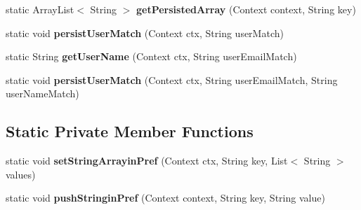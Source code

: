 \begin{DoxyCompactItemize}
\item 
static Array\+List$<$ String $>$ {\bfseries get\+Persisted\+Array} (Context context, String key)\hypertarget{classcom_1_1example_1_1sebastian_1_1tindertp_1_1commonTools_1_1ArraySerialization_aab5218831832e2dfd0807177e139225d}{}\label{classcom_1_1example_1_1sebastian_1_1tindertp_1_1commonTools_1_1ArraySerialization_aab5218831832e2dfd0807177e139225d}

\item 
static void {\bfseries persist\+User\+Match} (Context ctx, String user\+Match)\hypertarget{classcom_1_1example_1_1sebastian_1_1tindertp_1_1commonTools_1_1ArraySerialization_a59bd32db77f877b42d4d0fe14dc4c5c0}{}\label{classcom_1_1example_1_1sebastian_1_1tindertp_1_1commonTools_1_1ArraySerialization_a59bd32db77f877b42d4d0fe14dc4c5c0}

\item 
static String {\bfseries get\+User\+Name} (Context ctx, String user\+Email\+Match)\hypertarget{classcom_1_1example_1_1sebastian_1_1tindertp_1_1commonTools_1_1ArraySerialization_aa7ae212523ee85ff8e3c1ab9ab2baf84}{}\label{classcom_1_1example_1_1sebastian_1_1tindertp_1_1commonTools_1_1ArraySerialization_aa7ae212523ee85ff8e3c1ab9ab2baf84}

\item 
static void {\bfseries persist\+User\+Match} (Context ctx, String user\+Email\+Match, String user\+Name\+Match)\hypertarget{classcom_1_1example_1_1sebastian_1_1tindertp_1_1commonTools_1_1ArraySerialization_a74148a23761f8cd487aa6d48370e030d}{}\label{classcom_1_1example_1_1sebastian_1_1tindertp_1_1commonTools_1_1ArraySerialization_a74148a23761f8cd487aa6d48370e030d}

\end{DoxyCompactItemize}
\subsection*{Static Private Member Functions}
\begin{DoxyCompactItemize}
\item 
static void {\bfseries set\+String\+Arrayin\+Pref} (Context ctx, String key, List$<$ String $>$ values)\hypertarget{classcom_1_1example_1_1sebastian_1_1tindertp_1_1commonTools_1_1ArraySerialization_a5e7b7c56bf40ca5344db9806615e81ca}{}\label{classcom_1_1example_1_1sebastian_1_1tindertp_1_1commonTools_1_1ArraySerialization_a5e7b7c56bf40ca5344db9806615e81ca}

\item 
static void {\bfseries push\+Stringin\+Pref} (Context context, String key, String value)\hypertarget{classcom_1_1example_1_1sebastian_1_1tindertp_1_1commonTools_1_1ArraySerialization_a78eaa44f55be648142894e06f6ee089f}{}\label{classcom_1_1example_1_1sebastian_1_1tindertp_1_1commonTools_1_1ArraySerialization_a78eaa44f55be648142894e06f6ee089f}

\end{DoxyCompactItemize}
